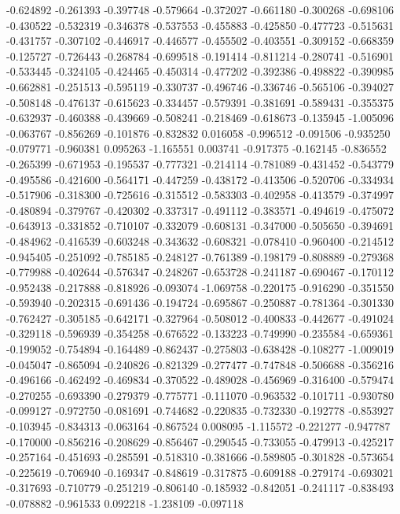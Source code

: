 -0.624892
-0.261393
-0.397748
-0.579664
-0.372027
-0.661180
-0.300268
-0.698106
-0.430522
-0.532319
-0.346378
-0.537553
-0.455883
-0.425850
-0.477723
-0.515631
-0.431757
-0.307102
-0.446917
-0.446577
-0.455502
-0.403551
-0.309152
-0.668359
-0.125727
-0.726443
-0.268784
-0.699518
-0.191414
-0.811214
-0.280741
-0.516901
-0.533445
-0.324105
-0.424465
-0.450314
-0.477202
-0.392386
-0.498822
-0.390985
-0.662881
-0.251513
-0.595119
-0.330737
-0.496746
-0.336746
-0.565106
-0.394027
-0.508148
-0.476137
-0.615623
-0.334457
-0.579391
-0.381691
-0.589431
-0.355375
-0.632937
-0.460388
-0.439669
-0.508241
-0.218469
-0.618673
-0.135945
-1.005096
-0.063767
-0.856269
-0.101876
-0.832832
0.016058
-0.996512
-0.091506
-0.935250
-0.079771
-0.960381
0.095263
-1.165551
0.003741
-0.917375
-0.162145
-0.836552
-0.265399
-0.671953
-0.195537
-0.777321
-0.214114
-0.781089
-0.431452
-0.543779
-0.495586
-0.421600
-0.564171
-0.447259
-0.438172
-0.413506
-0.520706
-0.334934
-0.517906
-0.318300
-0.725616
-0.315512
-0.583303
-0.402958
-0.413579
-0.374997
-0.480894
-0.379767
-0.420302
-0.337317
-0.491112
-0.383571
-0.494619
-0.475072
-0.643913
-0.331852
-0.710107
-0.332079
-0.608131
-0.347000
-0.505650
-0.394691
-0.484962
-0.416539
-0.603248
-0.343632
-0.608321
-0.078410
-0.960400
-0.214512
-0.945405
-0.251092
-0.785185
-0.248127
-0.761389
-0.198179
-0.808889
-0.279368
-0.779988
-0.402644
-0.576347
-0.248267
-0.653728
-0.241187
-0.690467
-0.170112
-0.952438
-0.217888
-0.818926
-0.093074
-1.069758
-0.220175
-0.916290
-0.351550
-0.593940
-0.202315
-0.691436
-0.194724
-0.695867
-0.250887
-0.781364
-0.301330
-0.762427
-0.305185
-0.642171
-0.327964
-0.508012
-0.400833
-0.442677
-0.491024
-0.329118
-0.596939
-0.354258
-0.676522
-0.133223
-0.749990
-0.235584
-0.659361
-0.199052
-0.754894
-0.164489
-0.862437
-0.275803
-0.638428
-0.108277
-1.009019
-0.045047
-0.865094
-0.240826
-0.821329
-0.277477
-0.747848
-0.506688
-0.356216
-0.496166
-0.462492
-0.469834
-0.370522
-0.489028
-0.456969
-0.316400
-0.579474
-0.270255
-0.693390
-0.279379
-0.775771
-0.111070
-0.963532
-0.101711
-0.930780
-0.099127
-0.972750
-0.081691
-0.744682
-0.220835
-0.732330
-0.192778
-0.853927
-0.103945
-0.834313
-0.063164
-0.867524
0.008095
-1.115572
-0.221277
-0.947787
-0.170000
-0.856216
-0.208629
-0.856467
-0.290545
-0.733055
-0.479913
-0.425217
-0.257164
-0.451693
-0.285591
-0.518310
-0.381666
-0.589805
-0.301828
-0.573654
-0.225619
-0.706940
-0.169347
-0.848619
-0.317875
-0.609188
-0.279174
-0.693021
-0.317693
-0.710779
-0.251219
-0.806140
-0.185932
-0.842051
-0.241117
-0.838493
-0.078882
-0.961533
0.092218
-1.238109
-0.097118
